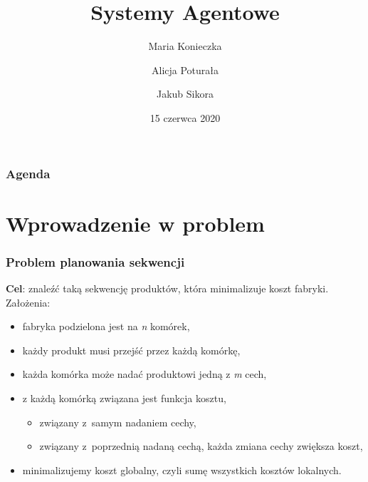 \documentclass{beamer}
\title[SAG - Projekt]{Systemy Agentowe}
\author[Konieczka, Poturała, Sikora]{Maria Konieczka \and Alicja Poturała \and Jakub Sikora}
\date{15 czerwca 2020}
\institute[]{Planowanie pracy w fabryce}
\begin{document}
\begin{frame}
    \titlepage
\end{frame}

\begin{frame}
    \frametitle{Agenda}
    \tableofcontents
\end{frame}

\section{Wprowadzenie w problem}
\begin{frame}
    \frametitle{Problem planowania sekwencji}
    \textbf{Cel}: znaleźć taką sekwencję produktów, która minimalizuje koszt fabryki.\\
    \medskip    
    Założenia:
    \begin{itemize}
        \item fabryka podzielona jest na \emph{n} komórek,
        \item każdy produkt musi przejść przez każdą komórkę,
        \item każda komórka może nadać produktowi jedną z \emph{m} cech,
        \item z każdą komórką związana jest funkcja kosztu,
        \begin{itemize}
            \item związany z~samym nadaniem cechy,
            \item związany z~poprzednią nadaną cechą, każda zmiana cechy zwiększa koszt,
        \end{itemize} 
        \item minimalizujemy koszt globalny, czyli sumę wszystkich kosztów lokalnych.
    \end{itemize}
\end{frame}
\end{document}
